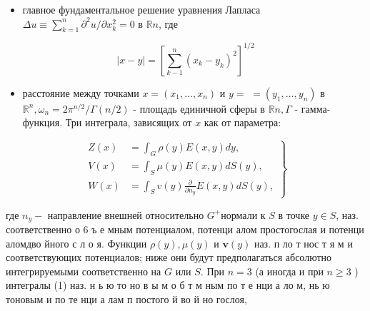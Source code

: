 \documentclass[10pt]{article}
\begin{document}
\begin{itemize}

  \item главное фундаментальное решение уравнения Лапласа $\Delta u \equiv \sum_{k=1}^{n} \partial^{2} u / \partial x_{k}^{2}=0$ в $\mathbb{R} n$, где

\end{itemize}



\[

|x-y|=\left[\sum_{k-1}^{n}\left(x_{k}-y_{k}\right)^{2}\right]^{1 / 2}

\]



\begin{itemize}

  \item расстояние между точками $x=\left(x_{1}, \ldots, x_{n}\right)$ и $y=$ $=\left(y_{1}, \ldots, y_{n}\right)$ в $\mathbb{R}^{n}, \omega_{n}=2 \pi^{n / 2} / \Gamma(n / 2)$ - площадь единичной сферы в $\mathbb{R} n, \Gamma$ - гамма-функция. Три интеграла, зависящих от $x$ как от параметра:

\end{itemize}



\[

\left.\begin{array}{rl}

Z(x) & =\int_{G} \rho(y) E(x, y) d y, \\

V(x) & =\int_{S} \mu(y) E(x, y) d S(y), \\

W(x) & =\int_{S} v(y) \frac{\partial}{\partial n_{y}} E(x, y) d S(y),

\end{array}\right\}

\]



где $n_{y}-$ направление внешней относительно $G^{+}$нормали к $S$ в точке $y \in S$, наз. соответственно о 6 ъ е мным потенциалом, потенци алом простогослая и потенци аломдво йного с л о я. Функции $\rho(y), \mu(y)$ и $\boldsymbol{v}(y)$ наз. п ло т нос т я м и соответствующих потенциалов; ниже они будут предполагаться абсолютно интегрируемыми соответственно на $G$ или $S$. При $n=3$ (а иногда и при $n \geqslant 3$ ) интегралы (1) наз. н ь ю то но в ы м о б т м ным по т е нци а ло м, нь ю тоновым и по те нци а лам п постого й во й но гослоя,
\end{document}
